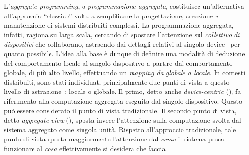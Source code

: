 L'\emph{aggregate programming}, o \emph{programmazione aggregata}, costituisce un'alternativa all'approccio ``classico''
volta a semplificare la progettazione, creazione e manutenzione di sistemi distribuiti complessi.
La programmazione aggregata, infatti, ragiona su larga scala, cercando di spostare l'attenzione sul \emph{collettivo di dispositivi} che collaborano,
astraendo dai dettagli relativi al singolo device~\cite{7274429} per quanto possibile.
L'idea alla base è dunque di definire una modalità di deduzione del comportamento locale al singolo dispositivo a partire dal comportamento globale, di più alto livello,
effettuando un \emph{mapping da globale a locale}.
In contesti distribuiti, sono stati individuati principalmente due punti di vista a questo livello di astrazione~\cite{7274429,aggregatescala-pmldc2016}: locale o globale.
Il primo, detto anche \emph{device-centric} (), fa riferimento alla computazione aggregata eseguita dal singolo dispositivo.
Questo può essere considerato il punto di vista tradizionale.
Il secondo punto di vista, detto \emph{aggregate view} (), sposta invece l'attenzione sulla computazione svolta dal sistema aggregato come singola unità.
Rispetto all'approccio tradizionale, tale punto di vista sposta maggiormente l'attenzione dal \emph{come} il sistema possa funzionare
al \emph{cosa} effettivamente si desidera che faccia.

